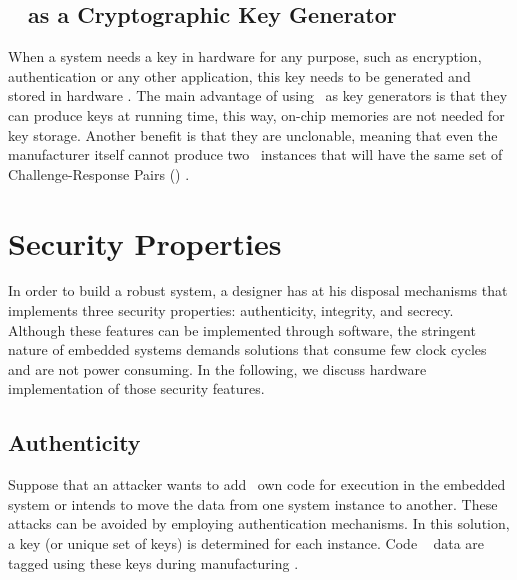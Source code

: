 \subsection{\puf~ as a Cryptographic  Key Generator }
When a system needs a key in hardware for any purpose, such as encryption, authentication or any other application, this key needs to be generated  and stored in hardware \cite{puf-key-devadas-1278484}. The main advantage of using \pufs~as key generators is that they can produce keys at running time, this way, on-chip memories are not needed for key storage. Another benefit is that they are unclonable, meaning that even the manufacturer itself cannot produce two \puf~instances that will have the same set of Challenge-Response Pairs (\crps) \cite{Gassend2002:PUFs}. 


\section{Security Properties}
\label{sec:securityproperties}
In order to build a robust system, a designer has at his disposal mechanisms that implements three security properties: authenticity, integrity, and secrecy. Although these features can be implemented through software, the stringent nature of embedded systems demands solutions that consume few clock cycles and are not power consuming.
In the following, we discuss hardware implementation of those security features.

\subsection{Authenticity}
\label{subsec:Authenticity}
Suppose that an attacker wants to add \hisher~own code for execution in the embedded system or intends to move the data from one system instance to another. These attacks can be avoided by employing authentication mechanisms. In this solution, a key (or unique set of keys) is determined for each instance.
Code \andor~ data are tagged using these keys during manufacturing .  

